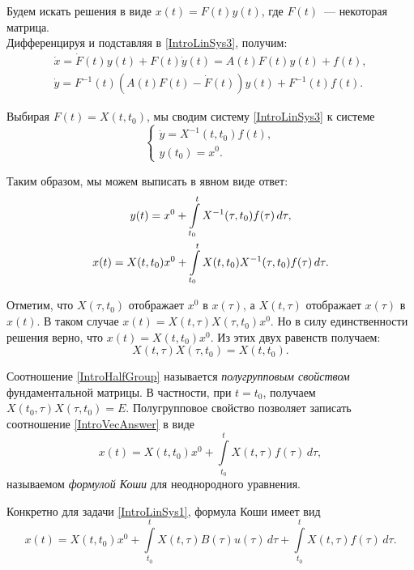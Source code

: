 Будем искать решения в виде $x(t) = F(t)y(t)$,
где $F(t)$~--- некоторая матрица.\\
Дифференцируя и подставляя в \eqref{IntroLinSys3}, получим:
\begin{gather*}
  \dot{x} = \dot{F}(t)y(t) + F(t) \dot{y}(t) = A(t)F(t)y(t) + f(t),\\
  \dot{y} = F^{-1}(t)(A(t)F(t) - \dot{F}(t))y(t) + F^{-1}(t)f(t).
\end{gather*}

Выбирая $F(t) = X(t, t_0)$,
мы сводим систему \eqref{IntroLinSys3} к системе
\begin{equation*}
  \begin{cases}
    \dot{y} = X^{-1}(t, t_0) f(t),\\
    y(t_0)= x^0.
  \end{cases}
\end{equation*}

Таким образом, мы можем выписать в явном виде ответ:
\begin{gather}
  y(t) = x^0 +
         \int\limits_{t_0}^{t} X^{-1}(\tau, t_0) f(\tau)\,d\tau, \notag\\
\label{IntroVecAnswer}
  x(t) = X(t, t_0) x^0 +
         \int\limits_{t_0}^{t} X(t, t_0) X^{-1}(\tau, t_0) f(\tau)\,d\tau.
\end{gather}

Отметим, что $X(\tau, t_0)$ отображает $x^0$ в $x(\tau)$,
а $X(t, \tau)$ отображает $x(\tau)$ в $x(t)$.
В таком случае $x(t) = X(t, \tau) X(\tau, t_0) x^0$.
Но в силу единственности решения верно,
что $x(t) = X(t, t_0)x^0$.
Из этих двух равенств получаем:
\begin{equation}
\label{IntroHalfGroup}
  X(t, \tau) X(\tau, t_0) = X(t, t_0).
\end{equation}

Соотношение \eqref{IntroHalfGroup} называется
\emph{полугрупповым свойством} фундаментальной матрицы.
В частности, при $t = t_0$,
получаем $X(t_0, \tau) X(\tau, t_0) = E$.
Полугрупповое свойство позволяет записать
соотношение \eqref{IntroVecAnswer} в виде
\begin{equation*}
  x(t) = X(t, t_0) x^0 + \int\limits_{t_0}^{t} X(t, \tau) f(\tau)\,d\tau,
\end{equation*}
называемом \emph{формулой Коши} для неоднородного уравнения.

Конкретно для задачи \eqref{IntroLinSys1}, формула Коши имеет вид
\begin{equation*}
  x(t) = X(t, t_0)x ^0 +
         \int\limits_{t_0}^{t} X(t, \tau) B(\tau) u(\tau)\,d\tau +
         \int\limits_{t_0}^{t} X(t, \tau) f(\tau)\,d\tau.
\end{equation*}


